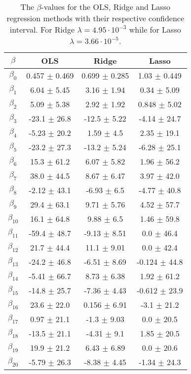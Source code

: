 \documentclass[uio,jmp,amsmath,amssymb,reprint,nofootinbib]{revtex4-1}
\numberwithin{equation}{section}
\begin{document}
\begin{table}
\begin{tabular}{|c|c|c|c|}\hline
\(\beta\) & OLS & Ridge & Lasso \\ \hline
\(\beta_{0}\) & 0.457 \(\pm\) 0.469 & 0.699 \(\pm\) 0.285 & 1.03 \(\pm\) 0.449 \\ \hline
\(\beta_{1}\) & 6.04 \(\pm\) 5.45 & 3.16 \(\pm\) 1.94 & 0.34 \(\pm\) 5.09 \\ \hline
\(\beta_{2}\) & 5.09 \(\pm\) 5.38 & 2.92 \(\pm\) 1.92 & 0.848 \(\pm\) 5.02 \\ \hline
\(\beta_{3}\) & -23.1 \(\pm\) 26.8 & -12.5 \(\pm\) 5.22 & -4.14 \(\pm\) 24.7 \\ \hline
\(\beta_{4}\) & -5.23 \(\pm\) 20.2 & 1.59 \(\pm\) 4.5 & 2.35 \(\pm\) 19.1 \\ \hline
\(\beta_{5}\) & -23.2 \(\pm\) 27.3 & -13.2 \(\pm\) 5.24 & -6.28 \(\pm\) 25.1 \\ \hline
\(\beta_{6}\) & 15.3 \(\pm\) 61.2 & 6.07 \(\pm\) 5.82 & 1.96 \(\pm\) 56.2 \\ \hline
\(\beta_{7}\) & 38.0 \(\pm\) 44.5 & 8.67 \(\pm\) 6.47 & 3.97 \(\pm\) 42.0 \\ \hline
\(\beta_{8}\) & -2.12 \(\pm\) 43.1 & -6.93 \(\pm\) 6.5 & -4.77 \(\pm\) 40.8 \\ \hline
\(\beta_{9}\) & 29.4 \(\pm\) 63.1 & 9.71 \(\pm\) 5.76 & 4.52 \(\pm\) 57.7 \\ \hline
\(\beta_{10}\) & 16.1 \(\pm\) 64.8 & 9.88 \(\pm\) 6.5 & 1.46 \(\pm\) 59.8 \\ \hline
\(\beta_{11}\) & -59.4 \(\pm\) 48.7 & -9.13 \(\pm\) 8.51 & 0.0 \(\pm\) 46.4 \\ \hline
\(\beta_{12}\) & 21.7 \(\pm\) 44.4 & 11.1 \(\pm\) 9.01 & 0.0 \(\pm\) 42.4 \\ \hline
\(\beta_{13}\) & -24.2 \(\pm\) 46.8 & -6.51 \(\pm\) 8.69 & -0.124 \(\pm\) 44.8 \\ \hline
\(\beta_{14}\) & -5.41 \(\pm\) 66.7 & 8.73 \(\pm\) 6.38 & 1.92 \(\pm\) 61.2 \\ \hline
\(\beta_{15}\) & -14.8 \(\pm\) 25.7 & -7.36 \(\pm\) 4.43 & -0.612 \(\pm\) 23.9 \\ \hline
\(\beta_{16}\) & 23.6 \(\pm\) 22.0 & 0.156 \(\pm\) 6.91 & -3.1 \(\pm\) 21.2 \\ \hline
\(\beta_{17}\) & 0.97 \(\pm\) 21.1 & -1.3 \(\pm\) 9.03 & 0.0 \(\pm\) 20.5 \\ \hline
\(\beta_{18}\) & -13.5 \(\pm\) 21.1 & -4.31 \(\pm\) 9.1 & 1.85 \(\pm\) 20.5 \\ \hline
\(\beta_{19}\) & 19.9 \(\pm\) 21.2 & 6.43 \(\pm\) 6.89 & 0.0 \(\pm\) 20.6 \\ \hline
\(\beta_{20}\) & -5.79 \(\pm\) 26.3 & -8.38 \(\pm\) 4.45 & -1.34 \(\pm\) 24.3 \\ \hline
\end{tabular}
\caption{The \(\beta\)-values for the OLS, Ridge and Lasso regression methods with their respective confidence interval. For Ridge \(\lambda = 4.95\cdot 10^{-3}\) while for Lasso \(\lambda = 3.66\cdot 10^{-5}\).}
\label{tab:03}
\end{table}
\end{document}
